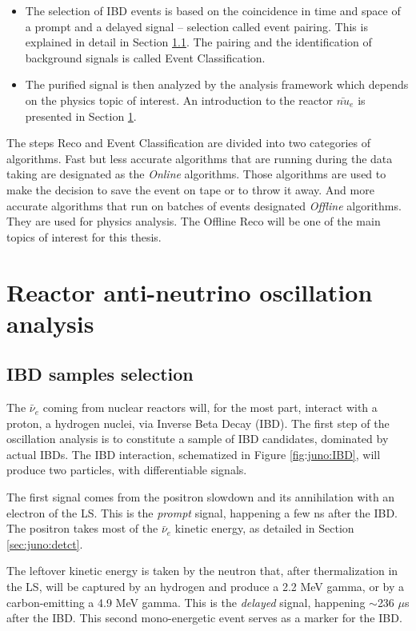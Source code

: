 \documentclass[../main.tex]{subfiles}
\begin{document}
\begin{itemize}
  \item The selection of IBD events is based on the coincidence in time and space of a prompt and a delayed signal -- selection called event pairing. This is explained in detail in Section \ref{sec:juno:Fit:selection}. The pairing and the identification of background signals is called Event Classification.
  \item The purified signal is then analyzed by the analysis framework which depends on the physics topic of interest. An introduction to the reactor $\bar{nu}_e$ is presented in Section \ref{sec:juno:Fit}.
\end{itemize}

The steps Reco and Event Classification are divided into two categories of algorithms. Fast but less accurate algorithms that are running during the data taking are designated as the \textit{Online} algorithms. Those algorithms are used to make the decision to save the event on tape or to throw it away. And more accurate algorithms that run on batches of events designated \textit{Offline} algorithms. They are used for physics analysis. The Offline Reco will be one of the main topics of interest for this thesis.


\section{Reactor anti-neutrino oscillation analysis}
\label{sec:juno:Fit}


\subsection{IBD samples selection}
\label{sec:juno:Fit:selection}

The $\bar{\nu}_e$ coming from nuclear reactors will, for the most part, interact with a proton, a hydrogen nuclei, via Inverse Beta Decay (IBD).
The first step of the oscillation analysis is to constitute a sample of IBD candidates, dominated by actual IBDs. The IBD interaction, schematized in Figure \ref{fig:juno:IBD}, will produce two particles, with differentiable signals.

The first signal comes from the positron slowdown and its annihilation with an electron of the LS. This is the \textit{prompt} signal, happening a few ns after the IBD. The positron takes most of the $\bar{\nu}_e$ kinetic energy, as detailed in Section \ref{sec:juno:detct}.

The leftover kinetic energy is taken by the neutron that, after thermalization in the LS, will be captured by an hydrogen and produce a 2.2 MeV gamma, or by a carbon-emitting a 4.9 MeV gamma. This is the \textit{delayed} signal, happening $\sim$236 $\mu$s after the IBD. This second mono-energetic event serves as a marker for the IBD.
\end{document}
